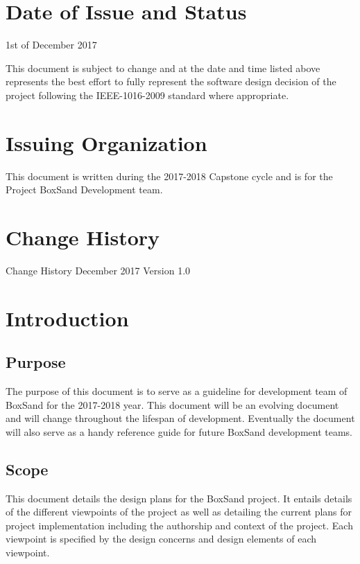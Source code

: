 \documentclass[onecolumn, draftclsnofoot,10pt, compsoc]{IEEEtran}
\begin{document}
\tableofcontents

\singlespacing
\section*{Date of Issue and Status}
1st of December 2017

\hfill \break
This document is subject to change and at the date and time listed above represents the best effort to fully represent the software design decision of the project following the IEEE-1016-2009 standard where appropriate.

\section*{Issuing Organization}
This document is written during the 2017-2018 Capstone cycle and is for the Project BoxSand Development team.  

\section*{Change History}
Change History
 December 2017 Version 1.0


\clearpage


\singlespacing

\section{Introduction}
\subsection{Purpose}
The purpose of this document is to serve as a guideline for development team of BoxSand for the 2017-2018 year. This document will be an evolving document and will change throughout the lifespan of development. Eventually the document  will also serve as a handy reference guide for future BoxSand development teams.

\subsection{Scope}
This document details the design plans for the BoxSand project. It entails details of the different viewpoints of the project as well as detailing the current plans for project implementation including the authorship and context of the project. Each viewpoint is specified by the design concerns and design elements of each viewpoint.
\end{document}
